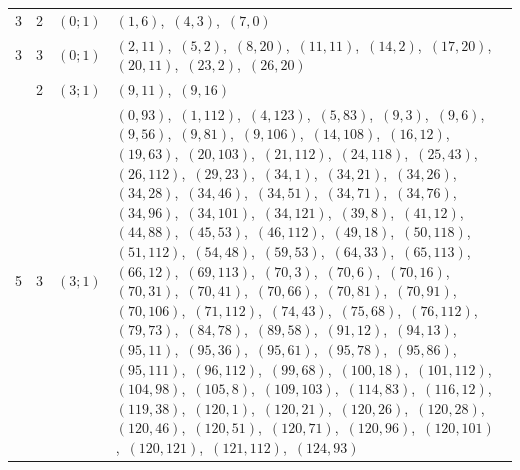 \documentclass[11pt]{article}
\begin{document}
\begin{longtable}{@{}rrl>{\raggedright\arraybackslash}p{}@{}}
3 & 2 & $(0;1)$ & $(1,6)$,\allowbreak\ $(4,3)$,\allowbreak\ $(7,0)$\\
3 & 3 & $(0;1)$ & $(2,11)$,\allowbreak\ $(5,2)$,\allowbreak\ $(8,20)$,\allowbreak\ $(11,11)$,\allowbreak\ $(14,2)$,\allowbreak\ $(17,20)$,\allowbreak\ $(20,11)$,\allowbreak\ $(23,2)$,\allowbreak\ $(26,20)$\\
\addlinespace[3pt]
5 & 2 & $(3;1)$ & $(9,11)$,\allowbreak\ $(9,16)$\\
5 & 3 & $(3;1)$ & $(0,93)$,\allowbreak\ $(1,112)$,\allowbreak\ $(4,123)$,\allowbreak\ $(5,83)$,\allowbreak\ $(9,3)$,\allowbreak\ $(9,6)$,\allowbreak\ $(9,56)$,\allowbreak\ $(9,81)$,\allowbreak\ $(9,106)$,\allowbreak\ $(14,108)$,\allowbreak\ $(16,12)$,\allowbreak\ $(19,63)$,\allowbreak\ $(20,103)$,\allowbreak\ $(21,112)$,\allowbreak\ $(24,118)$,\allowbreak\ $(25,43)$,\allowbreak\ $(26,112)$,\allowbreak\ $(29,23)$,\allowbreak\ $(34,1)$,\allowbreak\ $(34,21)$,\allowbreak\ $(34,26)$,\allowbreak\ $(34,28)$,\allowbreak\ $(34,46)$,\allowbreak\ $(34,51)$,\allowbreak\ $(34,71)$,\allowbreak\ $(34,76)$,\allowbreak\ $(34,96)$,\allowbreak\ $(34,101)$,\allowbreak\ $(34,121)$,\allowbreak\ $(39,8)$,\allowbreak\ $(41,12)$,\allowbreak\ $(44,88)$,\allowbreak\ $(45,53)$,\allowbreak\ $(46,112)$,\allowbreak\ $(49,18)$,\allowbreak\ $(50,118)$,\allowbreak\ $(51,112)$,\allowbreak\ $(54,48)$,\allowbreak\ $(59,53)$,\allowbreak\ $(64,33)$,\allowbreak\ $(65,113)$,\allowbreak\ $(66,12)$,\allowbreak\ $(69,113)$,\allowbreak\ $(70,3)$,\allowbreak\ $(70,6)$,\allowbreak\ $(70,16)$,\allowbreak\ $(70,31)$,\allowbreak\ $(70,41)$,\allowbreak\ $(70,66)$,\allowbreak\ $(70,81)$,\allowbreak\ $(70,91)$,\allowbreak\ $(70,106)$,\allowbreak\ $(71,112)$,\allowbreak\ $(74,43)$,\allowbreak\ $(75,68)$,\allowbreak\ $(76,112)$,\allowbreak\ $(79,73)$,\allowbreak\ $(84,78)$,\allowbreak\ $(89,58)$,\allowbreak\ $(91,12)$,\allowbreak\ $(94,13)$,\allowbreak\ $(95,11)$,\allowbreak\ $(95,36)$,\allowbreak\ $(95,61)$,\allowbreak\ $(95,78)$,\allowbreak\ $(95,86)$,\allowbreak\ $(95,111)$,\allowbreak\ $(96,112)$,\allowbreak\ $(99,68)$,\allowbreak\ $(100,18)$,\allowbreak\ $(101,112)$,\allowbreak\ $(104,98)$,\allowbreak\ $(105,8)$,\allowbreak\ $(109,103)$,\allowbreak\ $(114,83)$,\allowbreak\ $(116,12)$,\allowbreak\ $(119,38)$,\allowbreak\ $(120,1)$,\allowbreak\ $(120,21)$,\allowbreak\ $(120,26)$,\allowbreak\ $(120,28)$,\allowbreak\ $(120,46)$,\allowbreak\ $(120,51)$,\allowbreak\ $(120,71)$,\allowbreak\ $(120,96)$,\allowbreak\ $(120,101)$,\allowbreak\ $(120,121)$,\allowbreak\ $(121,112)$,\allowbreak\ $(124,93)$\\

\end{longtable}
\end{document}
